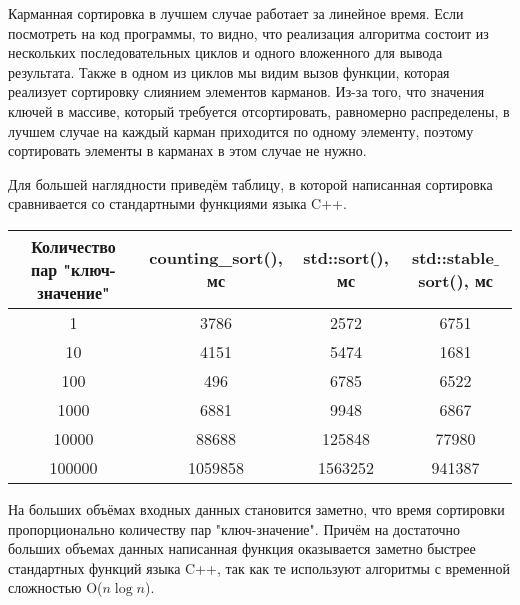\documentclass[12pt]{article}
\begin{document}
Карманная сортировка в лучшем случае работает за линейное время. Если посмотреть на код программы, то видно, что реализация алгоритма состоит из нескольких последовательных циклов и одного вложенного для вывода результата. Также в одном из циклов мы видим вызов функции, которая реализует сортировку слиянием элементов карманов. Из-за того, что значения ключей в массиве, который требуется отсортировать, равномерно распределены, в лучшем случае на каждый карман приходится по одному элементу, поэтому сортировать элементы в карманах в этом случае не нужно.

Для большей наглядности приведём таблицу, в которой написанная сортировка сравнивается со стандартными функциями языка C++.

\begin{center}
\begin{tabular}{ |c|c|c|c| }
    \hline
    Количество пар "ключ-значение" & counting\_sort(), мс & std::sort(), мс & std::stable$\_$sort(), мс \\
    \hline
    1 & 3786 & 2572 & 6751 \\
    10 & 4151 & 5474 & 1681 \\
    100 & 496 & 6785 & 6522 \\
    1000 & 6881 & 9948 & 6867 \\
    10000 & 88688 & 125848 & 77980 \\
    100000 & 1059858 & 1563252 & 941387 \\
    \hline
    \end{tabular}
\end{center}

На больших объёмах входных данных становится заметно, что время сортировки пропорционально количеству пар "ключ-значение". Причём на достаточно больших объемах данных написанная функция оказывается заметно быстрее стандартных функций языка C++, так как те используют алгоритмы с временной сложностью O($n \log{n}$).
\end{document}
